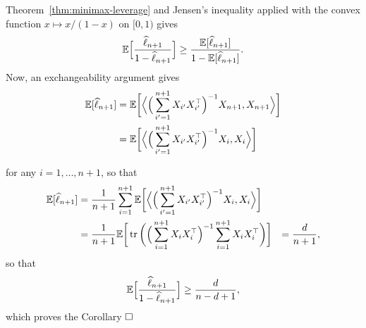 Theorem~\ref{thm:minimax-leverage} and Jensen's inequality applied with the convex function $x \mapsto x / (1-x)$ on $[0, 1)$ gives
\begin{equation*}
	\mathbb E \Big[ \frac{\widehat \ell_{n+1}}{1 - \widehat \ell_{n+1}} \Big] \geq \frac{\mathbb E[\widehat \ell_{n+1}]}{1 - \mathbb E[\widehat \ell_{n+1}]}.
\end{equation*}
Now, an exchangeability%
argument gives
\begin{align*}
	\mathbb E [\widehat \ell_{n + 1}] &= \mathbb E \bigg[ \Big \langle \Big( \sum_{i'=1}^{n+1} X_{i'} X_{i'}^\top 
	\Big)^{-1} X_{n+1}, X_{n+1} \Big \rangle \bigg] \\
	&= \mathbb E \bigg[ \Big \langle \Big( \sum_{i'=1}^{n+1} X_{i'} X_{i'}^\top \Big)^{-1} X_{i}, X_{i} 
	\Big \rangle \bigg]
\end{align*}

for any $i=1, \ldots, n+1$, so that
\begin{align*}
 	\mathbb E [\widehat \ell_{n + 1}] &= \frac{1}{n+1} \sum_{i=1}^{n+1} \mathbb E \bigg[ \Big \langle \Big( \sum_{i'=1}^{n+1} X_{i'} X_{i'}^\top \Big)^{-1} X_{i}, X_{i} \Big \rangle \bigg] \\
 	&= \frac{1}{n+1}  \mathbb E \bigg [ \operatorname{tr} \bigg( \Big( \sum_{i=1}^{n+1} X_i X_i^\top \Big)^{-1} \sum_{i=1}^{n+1} X_i X_i^\top \bigg) \bigg] 
 	&= \frac{d}{n + 1},
 \end{align*}
so that
\begin{equation*}
	\mathbb E \Big[ \frac{\widehat \ell_{n+1}}{1 - \widehat \ell_{n+1}} \Big] \geq \frac{d}{n - d + 1},
\end{equation*}
which proves the Corollary $\hfill \square$
